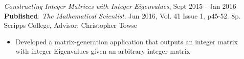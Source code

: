 {\sl Constructing Integer Matrices with Integer Eigenvalues}, \hfill Sept 2015 - Jan 2016\\
\textbf{Published}: \textit{The Mathematical Scientist}. Jun 2016, Vol. 41 Issue 1, p45-52. 8p. \\
Scripps College, Advisor: Christopher Towse
\begin{itemize} \itemsep -2pt
  \item Developed a matrix-generation application that outputs an integer matrix
    with integer Eigenvalues given an arbitrary integer matrix
\end{itemize}
